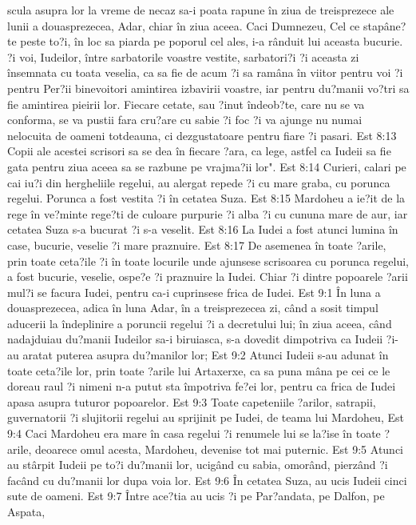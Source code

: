 scula asupra lor la vreme de necaz sa-i poata rapune în ziua de treisprezece ale lunii a douasprezecea, Adar, chiar în ziua aceea. Caci Dumnezeu, Cel ce stapâne?te peste to?i, în loc sa piarda pe poporul cel ales, i-a rânduit lui aceasta bucurie. ?i voi, Iudeilor, între sarbatorile voastre vestite, sarbatori?i ?i aceasta zi însemnata cu toata veselia, ca sa fie de acum ?i sa ramâna în viitor pentru voi ?i pentru Per?ii binevoitori amintirea izbavirii voastre, iar pentru du?manii vo?tri sa fie amintirea pieirii lor. Fiecare cetate, sau ?inut îndeob?te, care nu se va conforma, se va pustii fara cru?are cu sabie ?i foc ?i va ajunge nu numai nelocuita de oameni totdeauna, ci dezgustatoare pentru fiare ?i pasari.
Est 8:13  Copii ale acestei scrisori sa se dea în fiecare ?ara, ca lege, astfel ca Iudeii sa fie gata pentru ziua aceea sa se razbune pe vrajma?ii lor".
Est 8:14  Curieri, calari pe cai iu?i din hergheliile regelui, au alergat repede ?i cu mare graba, cu porunca regelui. Porunca a fost vestita ?i în cetatea Suza.
Est 8:15  Mardoheu a ie?it de la rege în ve?minte rege?ti de culoare purpurie ?i alba ?i cu cununa mare de aur, iar cetatea Suza s-a bucurat ?i s-a veselit.
Est 8:16  La Iudei a fost atunci lumina în case, bucurie, veselie ?i mare praznuire.
Est 8:17  De asemenea în toate ?arile, prin toate ceta?ile ?i în toate locurile unde ajunsese scrisoarea cu porunca regelui, a fost bucurie, veselie, ospe?e ?i praznuire la Iudei. Chiar ?i dintre popoarele ?arii mul?i se facura Iudei, pentru ca-i cuprinsese frica de Iudei.
Est 9:1  În luna a douasprezecea, adica în luna Adar, în a treisprezecea zi, când a sosit timpul aducerii la îndeplinire a poruncii regelui ?i a decretului lui; în ziua aceea, când nadajduiau du?manii Iudeilor sa-i biruiasca, s-a dovedit dimpotriva ca Iudeii ?i-au aratat puterea asupra du?manilor lor;
Est 9:2  Atunci Iudeii s-au adunat în toate ceta?ile lor, prin toate ?arile lui Artaxerxe, ca sa puna mâna pe cei ce le doreau raul ?i nimeni n-a putut sta împotriva fe?ei lor, pentru ca frica de Iudei apasa asupra tuturor popoarelor.
Est 9:3  Toate capeteniile ?arilor, satrapii, guvernatorii ?i slujitorii regelui au sprijinit pe Iudei, de teama lui Mardoheu,
Est 9:4  Caci Mardoheu era mare în casa regelui ?i renumele lui se la?ise în toate ?arile, deoarece omul acesta, Mardoheu, devenise tot mai puternic.
Est 9:5  Atunci au stârpit Iudeii pe to?i du?manii lor, ucigând cu sabia, omorând, pierzând ?i facând cu du?manii lor dupa voia lor.
Est 9:6  În cetatea Suza, au ucis Iudeii cinci sute de oameni.
Est 9:7  Între ace?tia au ucis ?i pe Par?andata, pe Dalfon, pe Aspata,
